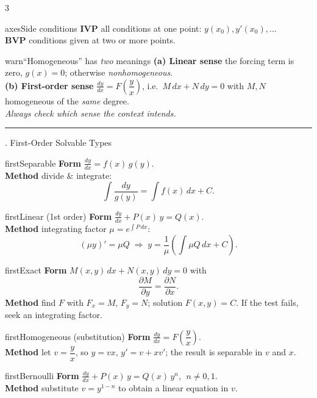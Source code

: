 \documentclass[10pt]{article}
\newcommand{\lab}[1]{\textcolor{ink}{\sffamily\footnotesize\textbf{#1}}\;}
\newcommand{\dydx}{\frac{dy}{dx}}
\newcommand{\sect}[2]{%
  \begin{tcolorbox}[blanker, breakable, before skip=2pt, after skip=2pt]
  \begingroup\sffamily\bfseries\normalsize\color{#1}%
  {\color{#1}\rule[-1pt]{3pt}{12pt}}\;#2\endgroup
  \par\vspace{1pt}{\color{#1}\hrule height 1pt}
  \end{tcolorbox}}
\begin{document}
\begin{multicols}{3}
\begin{card}{axes}{Side conditions}
\lab{IVP} all conditions at one point: $y(x_0),y'(x_0),\dots$\\
\lab{BVP} conditions given at two or more points.
\end{card}

\begin{card}{warn}{``Homogeneous'' has \emph{two} meanings}
\lab{(a) Linear sense} the forcing term is zero, $g(x)=0$; otherwise \emph{nonhomogeneous}.\\[2pt]
\lab{(b) First-order sense} $\dydx=F\!\left(\dfrac{y}{x}\right)$, i.e.\ $M\,dx+N\,dy=0$ with $M,N$ homogeneous of the \emph{same} degree.\\[2pt]
\textit{Always check which sense the context intends.}
\end{card}

\columnbreak
\sect{first}{2.\; First-Order Solvable Types}

\begin{card}{first}{Separable}
\lab{Form} $\dydx=f(x)\,g(y)$.\\
\lab{Method} divide \& integrate:
\[
\int\frac{dy}{g(y)}=\int f(x)\,dx + C.
\]
\end{card}

\begin{card}{first}{Linear (1st order)}
\lab{Form} $\dydx+P(x)\,y=Q(x)$.\\
\lab{Method} integrating factor $\mu=e^{\int P\,dx}$:
\[
(\mu y)'=\mu Q \;\Rightarrow\; y=\frac{1}{\mu}\!\left(\int \mu Q\,dx + C\right).
\]
\end{card}

\begin{card}{first}{Exact}
\lab{Form} $M(x,y)\,dx+N(x,y)\,dy=0$ with
\[
\frac{\partial M}{\partial y}=\frac{\partial N}{\partial x}.
\]
\lab{Method} find $F$ with $F_x=M,\,F_y=N$; solution $F(x,y)=C$. If the test fails, seek an integrating factor.
\end{card}

\begin{card}{first}{Homogeneous (substitution)}
\lab{Form} $\dydx=F\!\left(\dfrac{y}{x}\right)$.\\
\lab{Method} let $v=\dfrac{y}{x}$, so $y=vx$, $y'=v+xv'$; the result is separable in $v$ and $x$.
\end{card}

\begin{card}{first}{Bernoulli}
\lab{Form} $\dydx+P(x)\,y=Q(x)\,y^{n}$, $\;n\neq0,1$.\\
\lab{Method} substitute $v=y^{1-n}$ to obtain a linear equation in $v$.
\end{card}


\end{multicols}
\end{document}
